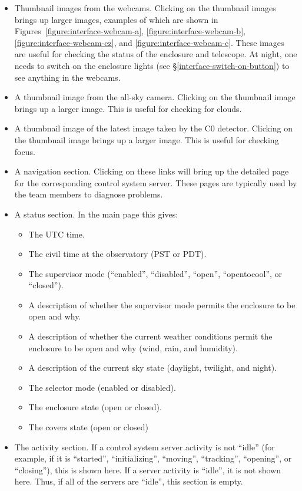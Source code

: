 \begin{itemize}
\item
Thumbnail images from the webcams. Clicking on the thumbnail images brings up larger images, examples of which are shown in Figures~\ref{figure:interface-webcam-a}, \ref{figure:interface-webcam-b}, \ref{figure:interface-webcam-cz}, and \ref{figure:interface-webcam-c}. These images are useful for checking the status of the enclosure and telescope. At night, one needs to switch on the enclosure lights (see \S\ref{interface-switch-on-button}) to see anything in the webcams.  
\item
A thumbnail image from the all-sky camera. Clicking on the thumbnail image brings up a larger image. This is useful for checking for clouds.
\item
A thumbnail image of the latest image taken by the C0 detector. Clicking on the thumbnail image brings up a larger image. This is useful for checking focus.
\item
A navigation section. Clicking on these links will bring up the detailed page for the corresponding control system server. These pages are typically used by the team members to diagnose problems.
\item
A status section. In the main page this gives:
\begin{itemize}
\item
The UTC time.
\item
The civil time at the observatory (PST or PDT).
\item
The supervisor mode (“enabled”, “disabled”, “open”, “opentocool”, or “closed”).
\item
A description of whether the supervisor mode permits the enclosure to be open and why.
\item
A description of whether the current weather conditions permit the enclosure to be open and why (wind, rain, and humidity).
\item
A description of the current sky state (daylight, twilight, and night).
\item
The selector mode (enabled or disabled).
\item
The enclosure state (open or closed).
\item
The covers state (open or closed)
\end{itemize}
\item
The activity section. If a control system server activity is not “idle” (for example, if it is “started”, “initializing”, “moving”, “tracking”, “opening”, or “closing”), this is shown here. If a server activity is “idle”, it is not shown here. Thus, if all of the servers are “idle”, this section is empty.


\end{itemize}
